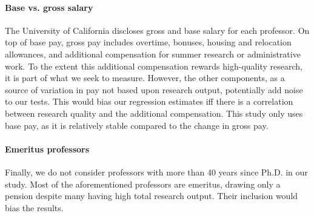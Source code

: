 \paragraph{Base vs. gross salary}
The University of California discloses gross and base salary for each professor. On top of base pay, gross pay includes overtime, bonuses, housing and relocation allowances, and additional compensation for summer research or administrative work. To the extent this additional compensation rewards high-quality research, it is part of what we seek to measure. However, the other components, as a source of variation in pay not based upon research output, potentially add noise to our tests. This would bias our regression estimates iff there is a correlation between research quality and the additional compensation. This study only uses base pay, as it is relatively stable compared to the change in gross pay.

\paragraph{Emeritus professors}
Finally, we do not consider professors with more than 40 years since Ph.D. in our study. Most of the aforementioned professors are emeritus, drawing only a pension despite many having high total research output. Their inclusion would bias the results.
